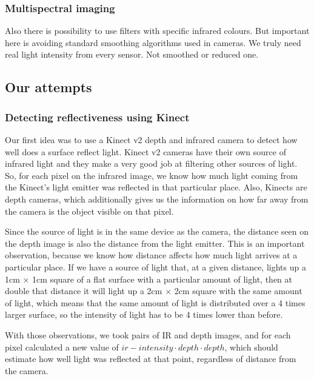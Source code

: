         \subsubsection*{Multispectral imaging}
            Also there is possibility to use filters with specific infrared colours.
            But important here is avoiding standard smoothing algorithms used
            in cameras. We truly need real light intensity from every sensor.
            Not smoothed or reduced one.

    \subsection{Our attempts}

        \subsubsection{Detecting reflectiveness using Kinect}
            Our first idea was to use a Kinect v2 depth and infrared camera to detect
            how well does a surface reflect light.
            Kinect v2 cameras have their own source of infrared light and they make
            a very good job at filtering other sources of light.
            So, for each pixel on the infrared image, we know how much light coming
            from the Kinect's light emitter was reflected in that particular place.
            Also, Kinects are depth cameras, which additionally gives us the information
            on how far away from the camera is the object visible on that pixel.

            Since the source of light is in the same device as the camera, the distance
            seen on the depth image is also the distance from the light emitter.
            This is an important observation, because we know how distance affects how
            much light arrives at a particular place. %
            If we have a source of light that, at a given distance, lights up a
            1cm $\times$ 1cm square of a flat surface with a particular amount
            of light, then at double that distance it will light up a 2cm $\times$ 2cm
            square with the same amount of light, which means that the same amount
            of light is distributed over a 4 times larger surface, so the
            intensity of light has to be 4 times lower than before.

            With those observations, we took pairs of IR and depth images, and for each
            pixel calculated a new value of $ir-intensity \cdot depth \cdot depth$,
            which should estimate how well light was reflected at that point,
            regardless of distance from the camera.

